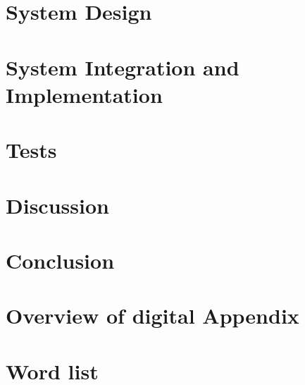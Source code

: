 \documentclass[a4paper, 10pt]{article}
\begin{document}
\section{System Design}\label{sec:System_Design}

\section{System Integration and Implementation}\label{sec:System_Integration_N_Implementation}



\section{Tests}\label{sec:Test}


\section{Discussion}\label{sec:Discussion}



\section{Conclusion}\label{sec:Conclusion}

\newpage



 
\newpage

\section{Overview of digital Appendix}\label{sec:digital_appendix}


\newpage
\section{Word list}\label{sec:wordlist}

\end{document}
